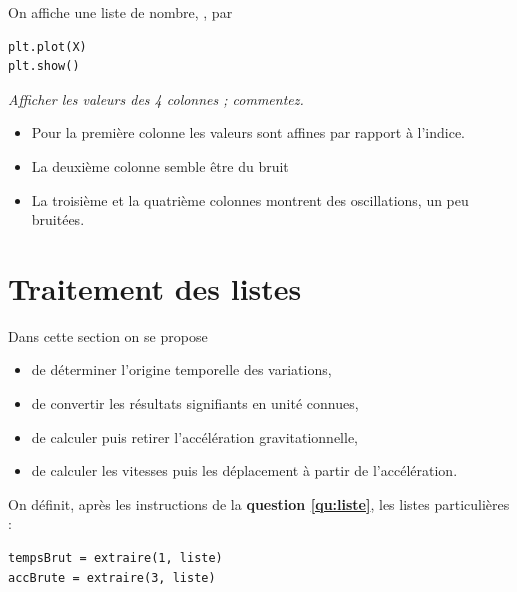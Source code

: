 On affiche une liste de nombre, , par
\begin{lstlisting}
plt.plot(X) 
plt.show()
\end{lstlisting}
\begin{Exercise}\it Afficher les valeurs des 4 colonnes ; commentez.
\end{Exercise}
\begin{Answer}
\begin{itemize}
  \item Pour la première colonne les valeurs sont affines par rapport à l'indice.
  \item La deuxième colonne semble être du bruit
  \item La troisième et la quatrième colonnes montrent des oscillations, un peu bruitées. 
\end{itemize}
\end{Answer}
\newpage
\section{Traitement des listes}
Dans cette section on se propose 
\begin{itemize}
  \item de déterminer l'origine temporelle des variations,
  \item de convertir les résultats signifiants en unité connues,
  \item de calculer puis retirer l'accélération gravitationnelle,
  \item de calculer les vitesses puis les déplacement à partir de l'accélération.
\end{itemize}  

On définit, après les instructions de la {\bf question \ref{qu:liste}}, les listes particulières :
\begin{lstlisting}
tempsBrut = extraire(1, liste)
accBrute = extraire(3, liste)
\end{lstlisting}

